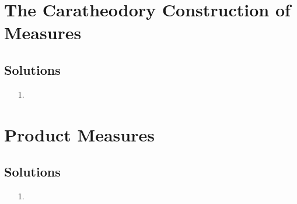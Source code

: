 \documentclass[oneside]{book}
\begin{document}
\chapter{The Caratheodory Construction of Measures}

\section*{Solutions}
\begin{enumerate}
\item[1.]

\end{enumerate}

\chapter{Product Measures}

\section*{Solutions}
\begin{enumerate}
\item[1.]

\end{enumerate}
\end{document}
